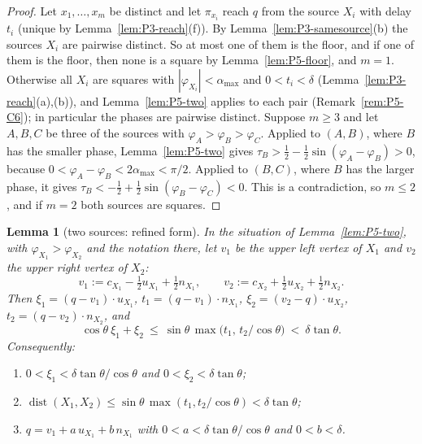 \documentclass[11pt]{amsart}
\newcommand{\dist}{\operatorname{dist}}
\newcommand{\amax}{\alpha_{\max}}
\newtheorem{lemma}[theorem]{Lemma}
\theoremstyle{definition}
\theoremstyle{remark}
\numberwithin{equation}{section}
\begin{document}
\begin{proof}
Let $x_1,\dots,x_m$ be distinct and let $\pi_{x_i}$ reach $q$ from the source $X_i$ with delay $t_i$ (unique by Lemma~\ref{lem:P3-reach}(f)). By Lemma~\ref{lem:P3-samesource}(b) the sources $X_i$ are pairwise distinct. So at most one of them is the floor, and if one of them is the floor, then none is a square by Lemma~\ref{lem:P5-floor}, and $m=1$. Otherwise all $X_i$ are squares with $|\varphi_{X_i}|<\amax$ and $0<t_i<\delta$ (Lemma~\ref{lem:P3-reach}(a),(b)), and Lemma~\ref{lem:P5-two} applies to each pair (Remark~\ref{rem:P5-C6}); in particular the phases are pairwise distinct. Suppose $m\ge3$ and let $A,B,C$ be three of the sources with $\varphi_A>\varphi_B>\varphi_C$. Applied to $(A,B)$, where $B$ has the smaller phase, Lemma~\ref{lem:P5-two} gives $\tau_B>\frac12-\frac12\sin(\varphi_A-\varphi_B)>0$, because $0<\varphi_A-\varphi_B<2\amax<\pi/2$. Applied to $(B,C)$, where $B$ has the larger phase, it gives $\tau_B<-\frac12+\frac12\sin(\varphi_B-\varphi_C)<0$. This is a contradiction, so $m\le2$, and if $m=2$ both sources are squares.
\end{proof}

\begin{lemma}[two sources: refined form]\label{lem:P5-refined}
In the situation of Lemma~\ref{lem:P5-two}, with $\varphi_{X_1}>\varphi_{X_2}$ and the notation there, let $v_1$ be the upper left vertex of $X_1$ and $v_2$ the upper right vertex of $X_2$:
\[
v_1:=c_{X_1}-\tfrac12u_{X_1}+\tfrac12n_{X_1},\qquad v_2:=c_{X_2}+\tfrac12u_{X_2}+\tfrac12n_{X_2}.
\]
Then $\xi_1=(q-v_1)\cdot u_{X_1}$, $t_1=(q-v_1)\cdot n_{X_1}$, $\xi_2=(v_2-q)\cdot u_{X_2}$, $t_2=(q-v_2)\cdot n_{X_2}$, and
\begin{equation}\label{eq:P5-star}
\cos\theta\ \xi_1+\xi_2\ \le\ \sin\theta\,\max\big(t_1,\,t_2/\cos\theta\big)\ <\ \delta\tan\theta .
\end{equation}
Consequently:
\begin{enumerate}[label=(\roman*)]
\item $0<\xi_1<\delta\tan\theta/\cos\theta$ and $0<\xi_2<\delta\tan\theta$;
\item $\dist(X_1,X_2)\le\sin\theta\,\max(t_1,t_2/\cos\theta)<\delta\tan\theta$;
\item $q=v_1+a\,u_{X_1}+b\,n_{X_1}$ with $0<a<\delta\tan\theta/\cos\theta$ and $0<b<\delta$.
\end{enumerate}
\end{lemma}
\end{document}
